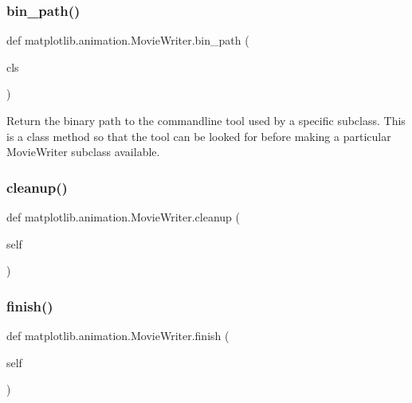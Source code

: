 \subsubsection{\texorpdfstring{bin\+\_\+path()}{bin\_path()}}
{\footnotesize\ttfamily def matplotlib.\+animation.\+Movie\+Writer.\+bin\+\_\+path (\begin{DoxyParamCaption}\item[{}]{cls }\end{DoxyParamCaption})}

\begin{DoxyVerb}Return the binary path to the commandline tool used by a specific
subclass. This is a class method so that the tool can be looked for
before making a particular MovieWriter subclass available.
\end{DoxyVerb}
 \mbox{\label{classmatplotlib_1_1animation_1_1MovieWriter_a8ffc7e3a0acb51f826ae98e9abfb3ba8}} 
\subsubsection{\texorpdfstring{cleanup()}{cleanup()}}
{\footnotesize\ttfamily def matplotlib.\+animation.\+Movie\+Writer.\+cleanup (\begin{DoxyParamCaption}\item[{}]{self }\end{DoxyParamCaption})}

\mbox{\label{classmatplotlib_1_1animation_1_1MovieWriter_a6622232a5fc44d900011f61f6cd000fa}} 
\subsubsection{\texorpdfstring{finish()}{finish()}}
{\footnotesize\ttfamily def matplotlib.\+animation.\+Movie\+Writer.\+finish (\begin{DoxyParamCaption}\item[{}]{self }\end{DoxyParamCaption})}

